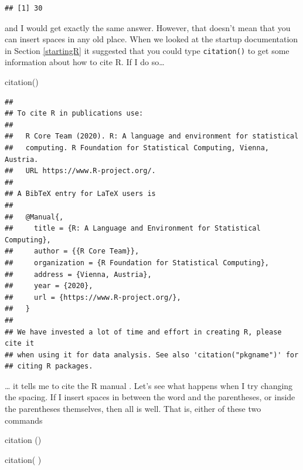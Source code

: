 \documentclass[
]{book}
\newenvironment{Shaded}{\begin{snugshade}}{\end{snugshade}}
\newcommand{\FunctionTok}[1]{\textcolor[rgb]{0.00,0.00,0.00}{#1}}
\newcommand{\NormalTok}[1]{#1}
\begin{document}
\begin{verbatim}
## [1] 30
\end{verbatim}

and I would get exactly the same answer. However, that doesn't mean that you can insert spaces in any old place. When we looked at the startup documentation in Section \ref{startingR} it suggested that you could type \texttt{citation()} to get some information about how to cite R. If I do so\ldots{}

\begin{Shaded}
\begin{Highlighting}[]
\FunctionTok{citation}\NormalTok{()}
\end{Highlighting}
\end{Shaded}

\begin{verbatim}
## 
## To cite R in publications use:
## 
##   R Core Team (2020). R: A language and environment for statistical
##   computing. R Foundation for Statistical Computing, Vienna, Austria.
##   URL https://www.R-project.org/.
## 
## A BibTeX entry for LaTeX users is
## 
##   @Manual{,
##     title = {R: A Language and Environment for Statistical Computing},
##     author = {{R Core Team}},
##     organization = {R Foundation for Statistical Computing},
##     address = {Vienna, Austria},
##     year = {2020},
##     url = {https://www.R-project.org/},
##   }
## 
## We have invested a lot of time and effort in creating R, please cite it
## when using it for data analysis. See also 'citation("pkgname")' for
## citing R packages.
\end{verbatim}

\ldots{} it tells me to cite the R manual \citep{R2013}. Let's see what happens when I try changing the spacing. If I insert spaces in between the word and the parentheses, or inside the parentheses themselves, then all is well. That is, either of these two commands

\begin{Shaded}
\begin{Highlighting}[]
\FunctionTok{citation}\NormalTok{ ()}
\end{Highlighting}
\end{Shaded}

\begin{Shaded}
\begin{Highlighting}[]
\FunctionTok{citation}\NormalTok{(  )}
\end{Highlighting}
\end{Shaded}
\end{document}

